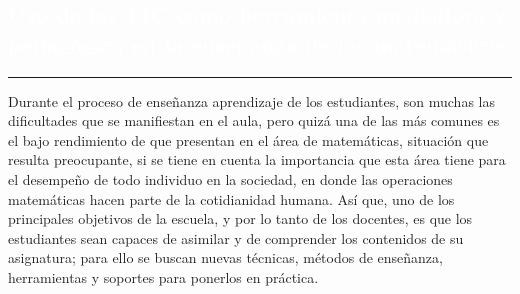 \pagecolor{white}
\pagestyle{eimat}

\begin{titlepage}
\pagecolor{white}
\newcommand{\R}{\ensuremath{\mathbb{R}}}
\BgThispage
{}
\vspace*{-1.1cm}
\noindent
\def\titulo#1{\section{#1}}

\section{\bf\large\textcolor{white}{Uso de las TIC como herramienta mediadora y pedag\'ogica en la ense\~nanza de las matem\'aticas}}
\vspace*{2cm}\par
\noindent

\begin{minipage}{0.5\linewidth}
\begin{minipage}{0.45\linewidth}
    \begin{flushright}
        \printauthor
    \end{flushright}
\end{minipage} \hspace{-3pt}
%
\begin{minipage}{0.02\linewidth}
   \color{ptctitle} \rule{1pt}{225pt}
\end{minipage} 
\end{minipage}
\hspace*{-4.5cm}
\begin{minipage}{0.85\linewidth}
\begin{minipage}{0.85\linewidth}
\footnotesize
\vspace{5pt}
    \begin{resumen}
    Durante el proceso de ense\~nanza aprendizaje de los estudiantes, son muchas las dificultades que se manifiestan en el aula, pero quiz\'{a} una de las m\'{a}s comunes es el bajo rendimiento de que presentan en el \'area de matem\'{a}ticas, situaci\'{o}n que resulta preocupante, si se tiene en cuenta la importancia que esta \'{a}rea tiene para el desempe\~no de todo individuo en la sociedad,  en donde las operaciones matem\'{a}ticas hacen parte de la cotidianidad humana. As\'i que, uno de los principales objetivos de la escuela, y por lo tanto de los docentes, es que los estudiantes sean capaces de asimilar y de comprender los contenidos de su asignatura; para ello se buscan nuevas t\'{e}cnicas, m\'{e}todos de ense\~nanza, herramientas y soportes para ponerlos en pr\'{a}ctica. 


\end{resumen}
\end{minipage}
\end{minipage}
\end{titlepage}
